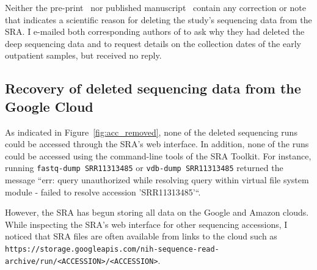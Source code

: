 \documentclass[9pt,twocolumn,twoside]{gsajnl_modified}
\begin{document}
Neither the pre-print~\citep{wang2020medRxiv} nor published manuscript~\citep{wang2020small} contain any correction or note that indicates a scientific reason for deleting the study's sequencing data from the SRA.
I e-mailed both corresponding authors of \citet{wang2020medRxiv} to ask why they had deleted the deep sequencing data and to request details on the collection dates of the early outpatient samples, but received no reply.

\subsection{Recovery of deleted sequencing data from the Google Cloud} 
As indicated in Figure~\ref{fig:acc_removed}, none of the deleted sequencing runs could be accessed through the SRA's web interface.
In addition, none of the runs could be accessed using the command-line tools of the SRA Toolkit.
For instance, running \texttt{fastq-dump SRR11313485} or \texttt{vdb-dump SRR11313485} returned the message ``err: query unauthorized while resolving query within virtual file system module - failed to resolve accession 'SRR11313485'``.

However, the SRA has begun storing all data on the Google and Amazon clouds.
While inspecting the SRA's web interface for other sequencing accessions, I noticed that SRA files are often available from links to the cloud such as \texttt{https://storage.googleapis.com/nih-sequence-read-archive/run/<ACCESSION>/<ACCESSION>}.
\end{document}
